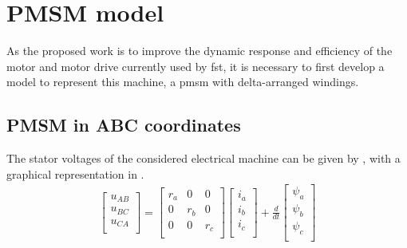 \vfill
\section{PMSM model}\label{section:PMSM model}
As the proposed work is to improve the dynamic response and efficiency of the motor and motor drive currently used by \gls{fst}, it is necessary to first develop a model to represent this machine, a \gls{pmsm} with delta-arranged windings.

\subsection{PMSM in ABC coordinates}
The stator voltages of the considered electrical machine can be given by , with a graphical representation in .
\begin{equation}
	\begin{aligned}
		\begin{bmatrix}
			u_{AB} \\
			u_{BC} \\
			u_{CA} \\
		\end{bmatrix}
		=
		\begin{bmatrix}
			r_a & 0   & 0   \\
			0   & r_b & 0   \\
			0   & 0   & r_c \\
		\end{bmatrix}
		\begin{bmatrix}
			i_a \\
			i_b \\
			i_c \\
		\end{bmatrix}
		+
		\frac{d}{dt}
		\begin{bmatrix}
			\psi_a \\
			\psi_b \\
			\psi_c \\
		\end{bmatrix}
	\end{aligned}
	\label{eq:flx_voltage_balance}%
\end{equation}


